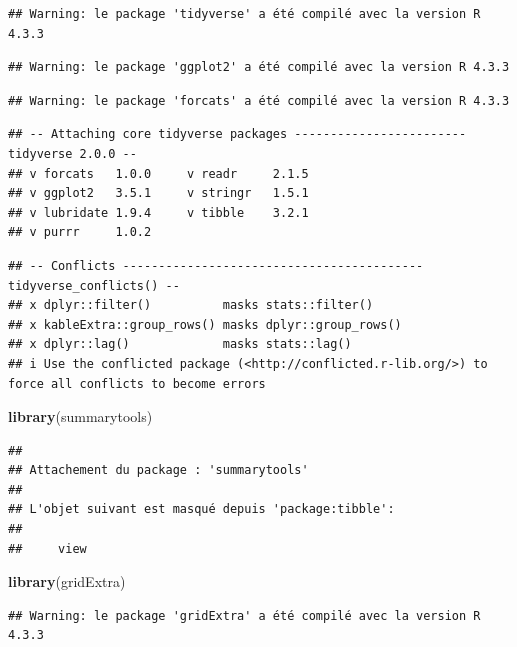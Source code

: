 \documentclass[
]{article}
\newenvironment{Shaded}{\begin{snugshade}}{\end{snugshade}}
\newcommand{\FunctionTok}[1]{\textcolor[rgb]{0.13,0.29,0.53}{\textbf{#1}}}
\newcommand{\NormalTok}[1]{#1}
\begin{document}
\begin{verbatim}
## Warning: le package 'tidyverse' a été compilé avec la version R 4.3.3
\end{verbatim}

\begin{verbatim}
## Warning: le package 'ggplot2' a été compilé avec la version R 4.3.3
\end{verbatim}

\begin{verbatim}
## Warning: le package 'forcats' a été compilé avec la version R 4.3.3
\end{verbatim}

\begin{verbatim}
## -- Attaching core tidyverse packages ------------------------ tidyverse 2.0.0 --
## v forcats   1.0.0     v readr     2.1.5
## v ggplot2   3.5.1     v stringr   1.5.1
## v lubridate 1.9.4     v tibble    3.2.1
## v purrr     1.0.2
\end{verbatim}

\begin{verbatim}
## -- Conflicts ------------------------------------------ tidyverse_conflicts() --
## x dplyr::filter()          masks stats::filter()
## x kableExtra::group_rows() masks dplyr::group_rows()
## x dplyr::lag()             masks stats::lag()
## i Use the conflicted package (<http://conflicted.r-lib.org/>) to force all conflicts to become errors
\end{verbatim}

\begin{Shaded}
\begin{Highlighting}[]
\FunctionTok{library}\NormalTok{(summarytools)}
\end{Highlighting}
\end{Shaded}

\begin{verbatim}
## 
## Attachement du package : 'summarytools'
## 
## L'objet suivant est masqué depuis 'package:tibble':
## 
##     view
\end{verbatim}

\begin{Shaded}
\begin{Highlighting}[]
\FunctionTok{library}\NormalTok{(gridExtra)}
\end{Highlighting}
\end{Shaded}

\begin{verbatim}
## Warning: le package 'gridExtra' a été compilé avec la version R 4.3.3
\end{verbatim}
\end{document}
